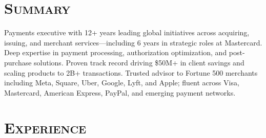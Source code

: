 \documentclass[11pt,a4paper]{moderncv}
\begin{document}
\makecvtitle
\vspace{-40pt}

\section{\textsc{Summary}}
\vspace{-5pt}
Payments executive with 12+ years leading global initiatives across acquiring, issuing, and merchant services---including 6 years in strategic roles at Mastercard. Deep expertise in payment processing, authorization optimization, and post-purchase solutions. Proven track record driving \$50M+ in client savings and scaling products to 2B+ transactions. Trusted advisor to Fortune 500 merchants including Meta, Square, Uber, Google, Lyft, and Apple; fluent across Visa, Mastercard, American Express, PayPal, and emerging payment networks.

\section{\textsc{Experience}}
\end{document}
